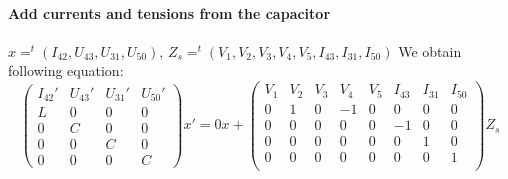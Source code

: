 \paragraph{Add currents and tensions from the capacitor}
$x=^{t}(I_{42},U_{43},U_{31},U_{50})$,
$Z_{s}=^{t}(V_{1},V_{2},V_{3},V_{4},V_{5},I_{43},I_{31},I_{50})$
We obtain following equation:
\[\left(\begin{array}{cccc}
  I_{42}'&U_{43}'&U_{31}'&U_{50}'\\
  \hline
L&0&0&0\\
0&C&0&0\\
0&0&C&0\\
0&0&0&C
\end{array}\right)x'=
0x+
\left(\begin{array}{cccccccc}
  V_{1}&V_{2}&V_{3}&V_{4}&V_{5}&I_{43}&I_{31}&I_{50}\\
  \hline
  0&1&0&-1&0&0&0&0\\
  0&0&0&0&0&-1&0&0\\
  0&0&0&0&0&0&1&0\\
  0&0&0&0&0&0&0&1\\
\end{array}\right)Z_{s}
\]
